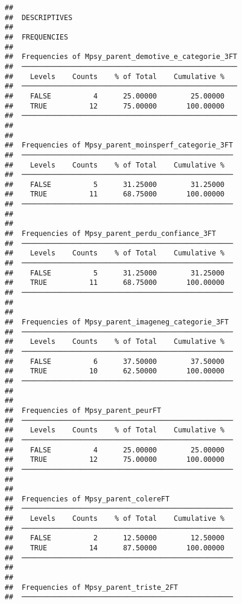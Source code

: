 \documentclass[
]{article}
\begin{document}
\begin{verbatim}
## 
##  DESCRIPTIVES
## 
##  FREQUENCIES
## 
##  Frequencies of Mpsy_parent_demotive_e_categorie_3FT 
##  ─────────────────────────────────────────────────── 
##    Levels    Counts    % of Total    Cumulative %   
##  ─────────────────────────────────────────────────── 
##    FALSE          4      25.00000        25.00000   
##    TRUE          12      75.00000       100.00000   
##  ─────────────────────────────────────────────────── 
## 
## 
##  Frequencies of Mpsy_parent_moinsperf_categorie_3FT 
##  ────────────────────────────────────────────────── 
##    Levels    Counts    % of Total    Cumulative %   
##  ────────────────────────────────────────────────── 
##    FALSE          5      31.25000        31.25000   
##    TRUE          11      68.75000       100.00000   
##  ────────────────────────────────────────────────── 
## 
## 
##  Frequencies of Mpsy_parent_perdu_confiance_3FT     
##  ────────────────────────────────────────────────── 
##    Levels    Counts    % of Total    Cumulative %   
##  ────────────────────────────────────────────────── 
##    FALSE          5      31.25000        31.25000   
##    TRUE          11      68.75000       100.00000   
##  ────────────────────────────────────────────────── 
## 
## 
##  Frequencies of Mpsy_parent_imageneg_categorie_3FT  
##  ────────────────────────────────────────────────── 
##    Levels    Counts    % of Total    Cumulative %   
##  ────────────────────────────────────────────────── 
##    FALSE          6      37.50000        37.50000   
##    TRUE          10      62.50000       100.00000   
##  ────────────────────────────────────────────────── 
## 
## 
##  Frequencies of Mpsy_parent_peurFT                  
##  ────────────────────────────────────────────────── 
##    Levels    Counts    % of Total    Cumulative %   
##  ────────────────────────────────────────────────── 
##    FALSE          4      25.00000        25.00000   
##    TRUE          12      75.00000       100.00000   
##  ────────────────────────────────────────────────── 
## 
## 
##  Frequencies of Mpsy_parent_colereFT                
##  ────────────────────────────────────────────────── 
##    Levels    Counts    % of Total    Cumulative %   
##  ────────────────────────────────────────────────── 
##    FALSE          2      12.50000        12.50000   
##    TRUE          14      87.50000       100.00000   
##  ────────────────────────────────────────────────── 
## 
## 
##  Frequencies of Mpsy_parent_triste_2FT              
##  ────────────────────────────────────────────────── 

\end{verbatim}
\end{document}
